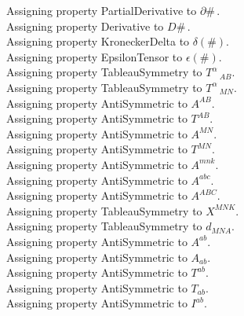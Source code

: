\documentclass[11pt]{article}
\begin{document}
Assigning property PartialDerivative to $\partial{\#}\, $.
\\
Assigning property Derivative to $D{\#}\, $.
\\
Assigning property KroneckerDelta to $\delta(\#)$.
\\
Assigning property EpsilonTensor to $\epsilon(\#)$.
\\
Assigning property TableauSymmetry to ${T}^{\alpha}\,_{A B}$.
\\
Assigning property TableauSymmetry to ${T}^{\alpha}\,_{M N}$.
\\
Assigning property AntiSymmetric to ${A}^{A B}$.
\\
Assigning property AntiSymmetric to ${T}^{A B}$.
\\
Assigning property AntiSymmetric to ${A}^{M N}$.
\\
Assigning property AntiSymmetric to ${T}^{M N}$.
\\
Assigning property AntiSymmetric to ${A}^{m n k}$.
\\
Assigning property AntiSymmetric to ${A}^{a b c}$.
\\
Assigning property AntiSymmetric to ${A}^{A B C}$.
\\
Assigning property TableauSymmetry to ${X}^{M N K}$.
\\
Assigning property TableauSymmetry to ${d}_{M N A}$.
\\
Assigning property AntiSymmetric to ${A}^{a b}$.
\\
Assigning property AntiSymmetric to ${A}_{a b}$.
\\
Assigning property AntiSymmetric to ${T}^{a b}$.
\\
Assigning property AntiSymmetric to ${T}_{a b}$.
\\
Assigning property AntiSymmetric to ${I}^{a b}$.
\\
\end{document}
